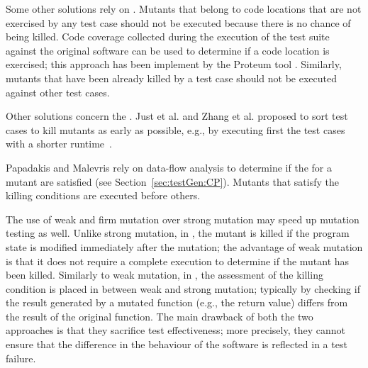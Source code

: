 Some other solutions rely on . Mutants that belong to code locations that are not exercised by any test case should not be executed because there is no chance of being killed. Code coverage collected during the execution of the test suite against the original software can be used to determine if a code location is exercised; this approach has been implement by the Proteum tool \cite{delamaro1996proteum}.
Similarly, mutants that have been already killed by a test case should not be executed against other test cases.

Other solutions concern the . Just et al. \cite{just2012using} and Zhang et al. \cite{zhang2013faster} proposed to sort test cases to kill mutants as early as possible, e.g., by executing first the test cases with a shorter runtime~\cite{just2012using}. 



Papadakis and Malevris \cite{papadakis2011automatically} rely on data-flow analysis to determine if the  for a mutant are satisfied (see Section~\ref{sec:testGen:CP}). Mutants that satisfy the killing conditions are executed before others.


The use of weak and firm mutation over strong mutation may speed up mutation testing as well.
Unlike strong mutation, 
in  \cite{ammann2016introduction}, the mutant is killed if the program state is modified immediately after the mutation; the advantage of weak mutation is that it does not require a complete execution to determine if the mutant has been killed. Similarly to weak mutation, in  \cite{ammann2016introduction}, the assessment of the killing condition is placed in between weak and strong mutation; typically by checking if the result generated by a mutated function (e.g., the return value) differs from the result of the original function. The main drawback of both the two approaches is that they sacrifice test effectiveness; more precisely, they cannot ensure that the difference in the behaviour of the software is reflected in a test failure.

